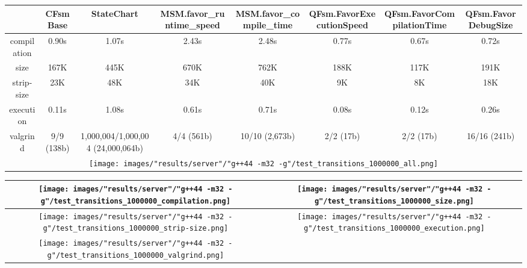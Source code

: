 \begin{landscape}
\begin{table}
\caption{"server" [54c084f], g++44 -m32 -g/test transitions 1000000}
\centering
\begin{longtable}{| c | c |c |c |c |c |c |c |}
\hline
& CFsmBase& StateChart& MSM.favor\_runtime\_speed& MSM.favor\_compile\_time& QFsm.FavorExecutionSpeed& QFsm.FavorCompilationTime& QFsm.FavorDebugSize\\
\hline
compilation & 0.90s & 1.07s & 2.43s & 2.48s & 0.77s & 0.67s & 0.72s\\
\hline
size & 167K & 445K & 670K & 762K & 188K & 117K & 191K\\
\hline
strip-size & 23K & 48K & 34K & 40K & 9K & 8K & 18K\\
\hline
execution & 0.11s & 1.08s & 0.61s & 0.71s & 0.08s & 0.12s & 0.26s\\
\hline
valgrind & 9/9 (138b) & 1,000,004/1,000,004 (24,000,064b) & 4/4 (561b) & 10/10 (2,673b) & 2/2 (17b) & 2/2 (17b) & 16/16 (241b)\\
\hline
\multicolumn{8}{|c|}{\texttt{[image: images/"results/server"/"g++44 -m32 -g"/test\_transitions\_1000000\_all.png]}}\\
\hline
\end{longtable}
\end{table}
\end{landscape}
\newpage
\begin{table}
\centering
\begin{longtable}{| c | c |}
\hline
\texttt{[image: images/"results/server"/"g++44 -m32 -g"/test\_transitions\_1000000\_compilation.png]}& \texttt{[image: images/"results/server"/"g++44 -m32 -g"/test\_transitions\_1000000\_size.png]}\\
\hline
\texttt{[image: images/"results/server"/"g++44 -m32 -g"/test\_transitions\_1000000\_strip-size.png]}& \texttt{[image: images/"results/server"/"g++44 -m32 -g"/test\_transitions\_1000000\_execution.png]}\\
\hline
\texttt{[image: images/"results/server"/"g++44 -m32 -g"/test\_transitions\_1000000\_valgrind.png]}& \\ \hline
\end{longtable}
\end{table}
